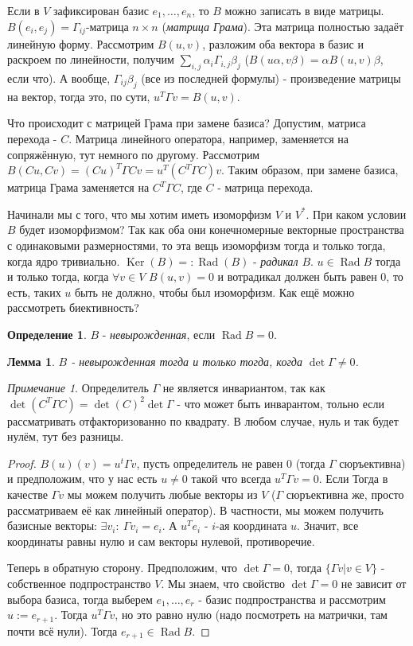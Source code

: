 \documentclass[a4paper,100pt]{article}
\theoremstyle{indented}
\newtheorem{lemma}{Лемма}
\theoremstyle{definition}
\newtheorem{defn}{Определение}
\theoremstyle{remark}
\newtheorem{remark}{Примечание}
\DeclareMathOperator{\Ker}{Ker}
\DeclareMathOperator{\Rad}{Rad}
\begin{document}
Если в $V$ зафиксирован базис $e_1, \ldots, e_n$, то $B$ можно записать в виде матрицы. $B(e_i, e_j)=\Gamma_{ij}$-матрица $n\times n$ (\textit{матрица Грама}). Эта матрица полностью задаёт линейную форму. Рассмотрим $B(u, v)$, разложим оба вектора в базис и раскроем по линейности, получим $\sum_{i, j}\alpha_i \Gamma_{i, j} \beta_j$ ($B(u \alpha, v \beta)=\alpha B(u, v) \beta$, если что). А вообще, $\Gamma_{ij}\beta_j$ (все из последней формулы) - произведение матрицы на вектор, тогда это, по сути, $u^T\Gamma v=B(u, v)$. \ 

Что происходит с матрицей Грама при замене базиса? Допустим, матриса перехода - $C$. Матрица линейного оператора, например, заменяется на сопряжённую, тут немного по другому. Рассмотрим $B(Cu, Cv)=(Cu)^T\Gamma Cv=u^T(C^T\Gamma C)v$. Таким образом, при замене базиса, матрица Грама заменяется на $C^T\Gamma C$, где $C$ - матрица перехода. \ 

Начинали мы с того, что мы хотим иметь изоморфизм $V$ и $V^*$. При каком условии $B$ будет изоморфизмом? Так как оба они конечномерные векторные пространства с одинаковыми размерностями, то эта вещь изоморфизм тогда и только тогда, когда ядро тривиально. $\Ker(B)=:\Rad(B)$ - \textit{радикал} $B$. $u\in \Rad B $ тогда и только тогда, когда $\forall v\in V$ $B(u, v)=0$ и вотрадикал должен быть равен 0, то есть, таких $u$ быть не должно, чтобы был изоморфизм. Как ещё можно рассмотреть биективность? 

\begin{defn}
    $B$ - \textit{невырожденная}, если $\Rad B=0$. 
\end{defn}

\begin{lemma}
    $B$ - невырожденная тогда и только тогда, когда $\det \Gamma \neq 0$. 
\end{lemma}

\begin{remark}
    Определитель $\Gamma$ не является инвариантом, так как $\det(C^T\Gamma C)=\det(C)^2\det \Gamma$ - что может быть инварантом, тольно если рассматривать отфакторизованно по квадрату. В любом случае, нуль и так будет нулём, тут без разницы.
\end{remark}

\begin{proof}
    $B(u)(v)=u^t\Gamma v$, пусть определитель не равен 0 (тогда $\Gamma$ сюръективна) и предположим, что у нас есть $u\neq 0$ такой что всегда $u^T\Gamma v=0$. Если Тогда в качестве $\Gamma v$ мы можем получить любые векторы из $V$ ($\Gamma$ сюръективна же, просто рассматриваем её как линейный оператор). В частности, мы можем получить базисные векторы: $\exists v_i: \: \Gamma v_i = e_i$. А $u^Te_i$ - $i$-ая координата $u$. Значит, все координаты равны нулю и сам векторы нулевой, противоречие. \ 

    Теперь в обратную сторону. Предположим, что $\det \Gamma = 0$, тогда $\{\Gamma v|v\in V\}$ - собственное подпространство $V$. Мы знаем, что свойство $\det \Gamma =0$ не зависит от выбора базиса, тогда выберем $e_1, \ldots, e_r$ - базис подпространства и рассмотрим $u:=e_{r+1}$. Тогда $u^T \Gamma v$, но это равно нулю (надо посмотреть на матрички, там почти всё нули). Тогда $e_{r+1}\in \Rad B$. 
\end{proof}
\end{document}
